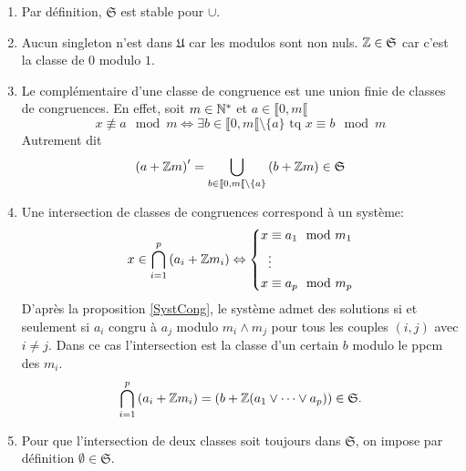 \begin{rems}
\begin{enumerate}
  \item Par définition, $\mathfrak{S}$ est stable pour $\cup$.
  
  \item  Aucun singleton n'est dans $\mathfrak{U}$ car les modulos sont non nuls. $\mathbb{Z} \in \mathfrak{S}$ car c'est la classe de $0$ modulo $1$.
  
  \item Le complémentaire d'une classe de congruence est une union finie de classes de congruences.\newline
En effet, soit $m \in \mathbb{N}^*$ et $a\in \llbracket 0, m \llbracket$
\begin{displaymath}
  x \not \equiv a \mod m \Leftrightarrow \exists b \in \llbracket 0, m \llbracket \setminus\{a\} \text{ tq } x \equiv b \mod m
\end{displaymath}
Autrement dit 
\begin{displaymath}
  \left(a + \mathbb{Z} m\right)' = \bigcup_{b \in \llbracket 0, m \llbracket \setminus\{a\}}\left(b + \mathbb{Z} m\right) \in \mathfrak{S}
\end{displaymath}

  \item Une intersection de classes de congruences correspond à un système:
\begin{displaymath}
  x \in \bigcap_{i=1}^{p}\left(a_i + \mathbb{Z} m_i\right) \Leftrightarrow
  \left\lbrace 
    \begin{align*}
      x &\equiv a_1 \mod m_1 \\
      &\vdots \\
      x &\equiv a_p \mod m_p
    \end{align*}
  \right.
\end{displaymath}
D'après la proposition \ref{SystCong}, le système admet des solutions si et seulement si $a_i$ congru à $a_j$ modulo $m_i\wedge m_j$ pour tous les couples $(i,j)$ avec $i \neq j$. Dans ce cas l'intersection est la classe d'un certain $b$ modulo le ppcm des $m_i$.
\begin{displaymath}
  \bigcap_{i=1}^{p}\left(a_i + \mathbb{Z} m_i\right) = \left( b + \mathbb{Z} (a_1 \vee \cdots \vee a_p) \right) \in \mathfrak{S}.
\end{displaymath}

  \item Pour que l'intersection de deux classes soit toujours dans $\mathfrak{S}$, on impose par définition $\emptyset \in \mathfrak{S}$. 
  

\end{enumerate}
\end{rems}
